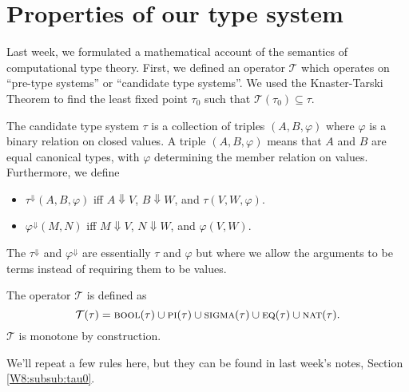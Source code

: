 \documentclass{article} \usepackage{chtt-notes} \usepackage{stmaryrd}
\newcommand{\T}{\mathcal{T}}
\begin{document}
\maketitle
\section{Properties of our type system}
%

Last week, we formulated a mathematical account of the semantics of computational
type theory. First, we defined an operator $\T$ which operates on ``pre-type systems''
or ``candidate type systems''. 
We used the Knaster-Tarski Theorem to find the least fixed point $\tau_0$ such that
$\T(\tau_0) \subseteq \tau$.

The candidate type system $\tau$ is a collection of triples $(A, B, \varphi)$ where
$\varphi$ is a binary relation on closed values. A triple $(A, B, \varphi)$ means that
$A$ and $B$ are equal canonical types, with $\varphi$ determining the member relation
on values. Furthermore, we define
\begin{itemize}
  \item $\tau^\Downarrow(A,B,\varphi)$ iff $A \Downarrow V$, $B \Downarrow W$, and $\tau(V, W, \varphi)$.
  \item $\varphi^\Downarrow(M,N)$ iff $M \Downarrow V$, $N \Downarrow W$, and $\varphi(V,W)$.
\end{itemize}
The $\tau^\Downarrow$ and $\varphi^\Downarrow$ are essentially $\tau$ and $\varphi$ but where
we allow the arguments to be terms instead of requiring them to be values.

The operator $\T$ is defined as
\[
  \T(\tau) = \textsc{bool}(\tau) \cup \textsc{pi}(\tau) \cup \textsc{sigma}(\tau) \cup
      \textsc{eq}(\tau) \cup \textsc{nat}(\tau).
\]
$\T$ is monotone by construction. 

We'll repeat a few rules here, but they can be found in last week's notes, Section \ref{W8:subsub:tau0}.
\end{document}
